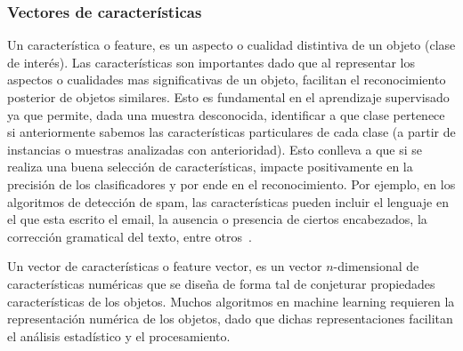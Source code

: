 \subsubsection{Vectores de características} \label{subsec:feature}

	Un característica o feature, es un aspecto o cualidad distintiva de un objeto (clase de interés). Las características son importantes dado que al representar los aspectos o cualidades mas significativas de un objeto, facilitan el reconocimiento posterior de objetos similares. Esto es fundamental en el aprendizaje supervisado ya que permite, dada una muestra desconocida, identificar a que clase pertenece si anteriormente sabemos las características particulares de cada clase (a partir de instancias o muestras analizadas con anterioridad). Esto conlleva a que si se realiza una buena selección de características, impacte positivamente en la precisión de los clasificadores y por ende en el reconocimiento. Por ejemplo, en los algoritmos de detección de spam, las características pueden incluir el lenguaje en el que esta escrito el email, la ausencia o presencia de ciertos encabezados, la corrección gramatical del texto, entre otros~\cite{SpamPaper}.

	Un vector de características o feature vector, es un  vector $n$-dimensional de características numéricas que se diseña de forma tal de conjeturar propiedades características de los objetos. Muchos algoritmos en machine learning requieren la representación numérica de los objetos, dado que dichas representaciones facilitan el análisis estadístico y el procesamiento.
		
	
		
	
